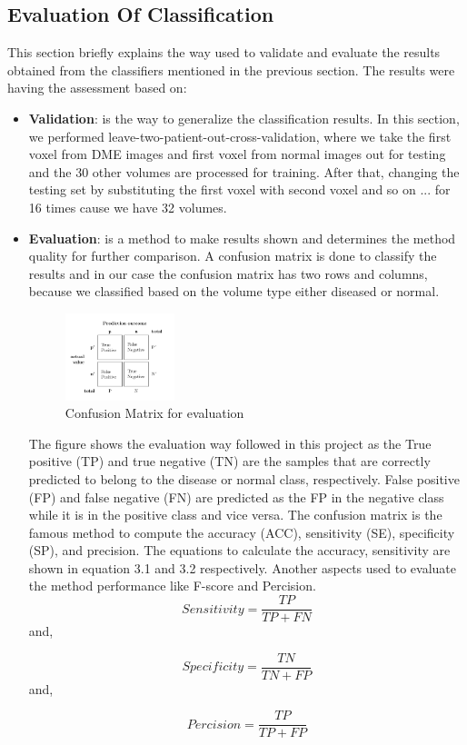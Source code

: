 \subsection{Evaluation Of Classification}
This section briefly explains the way used to validate and evaluate the results obtained from the classifiers mentioned in the previous section.
The results were having the assessment based on:
\begin{itemize}
\item \textbf{Validation}: is the way to generalize the classification results.
In this section, we performed leave-two-patient-out-cross-validation, where we take the first voxel from DME images and first voxel from normal images out for testing and the 30 other volumes are processed for training.
After that, changing the testing set by substituting the first voxel with second voxel and so on ... 
for 16 times cause we have 32 volumes.   
\item \textbf{Evaluation}: is a method to make results shown and determines the method quality for further comparison.
A confusion matrix is done to classify the results and in our case the confusion matrix has two rows and columns, because we classified based on the volume type either diseased or normal.
\begin{figure}[htb]
        \centering
        \includegraphics[width = 0.3\textwidth, height = 0.3\textheight]{figures/Confusion.png} %
  \caption{Confusion Matrix for evaluation \cite{confusion}}
  \label{fig:Confusion}
\end{figure}

The figure shows the evaluation way followed in this project as the True positive (TP) and true negative (TN) are the samples that are correctly predicted to belong to the disease or normal class, respectively.
False positive (FP) and false negative (FN) are predicted as the FP in the negative class while it is in the positive class and vice versa.
The confusion matrix is the famous method to compute the accuracy (ACC), sensitivity (SE), specificity (SP), and precision.
The equations to calculate the accuracy, sensitivity are shown in equation 3.1 and 3.2 respectively.
Another aspects used to evaluate the method performance like F-score and Percision.
\begin{equation}
Sensitivity = \frac{TP}{TP+FN}
\end{equation}
and,

\begin{equation}
Specificity = \frac{TN}{TN+FP}
\end{equation} 
and,

\begin{equation}
Percision = \frac{TP}{TP+FP}
\end{equation}
\end{itemize}


